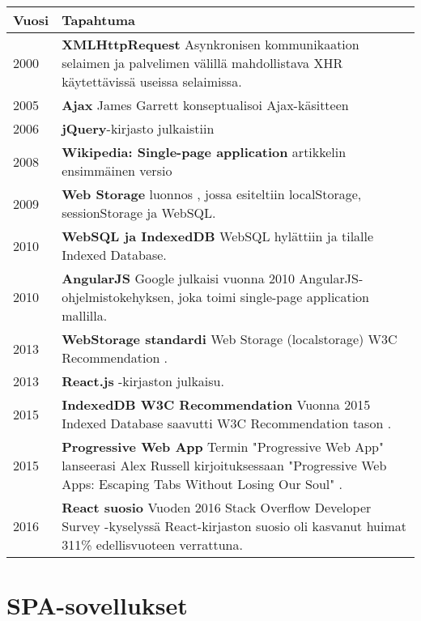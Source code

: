 \documentclass[finnish,twoside,censored,csm,sw-track-2018]{HYthesisML}
\begin{document}
\begin{center}
\begin{tabular}{ | m{2cm} | m{12cm} | } 
 \hline
 \textbf{Vuosi} & \textbf{Tapahtuma} \\ 
 \hline
 2000 & \textbf{XMLHttpRequest} Asynkronisen kommunikaation selaimen ja palvelimen välillä mahdollistava XHR käytettävissä useissa selaimissa. \citep{pwa-coined}\\ 
 \hline
 2005 & \textbf{Ajax} James Garrett konseptualisoi Ajax-käsitteen \citep{Ajax}\\ 
 \hline
 2006 & \textbf{jQuery}-kirjasto julkaistiin \citep{JSdefguide}\\
 \hline
 2008 & \textbf{Wikipedia: Single-page application} artikkelin ensimmäinen versio \citep{wikiSPA-2008} \\
 \hline
 2009 & \textbf{Web Storage} luonnos \citep{W3C-2009-webstorage}, jossa esiteltiin localStorage, sessionStorage ja WebSQL.\\
 \hline
 2010 & \textbf{WebSQL ja IndexedDB} WebSQL hylättiin \citep{W3C-2010-sqldatabase} ja tilalle \citep{W3C-2010-indexeddb} Indexed Database.\\
 \hline
  2010 & \textbf{AngularJS} Google julkaisi vuonna 2010 AngularJS-ohjelmistokehyksen, joka toimi single-page application mallilla. \citep{angularJS-release} \\
 \hline
 2013 & \textbf{WebStorage standardi} Web Storage (localstorage) W3C Recommendation \citep{W3C-2013-webstorage}. \\
 \hline
 2013 & \textbf{React.js} -kirjaston julkaisu. \\
 \hline
 2015 & \textbf{IndexedDB W3C Recommendation} Vuonna 2015 Indexed Database saavutti W3C Recommendation tason \citep{W3C-2015-indexeddb}. \\
 \hline
 2015 & \textbf{Progressive Web App} Termin "Progressive Web App" lanseerasi Alex Russell kirjoituksessaan "Progressive Web Apps: Escaping Tabs Without Losing Our Soul" \citep{pwa-coined}. \\
 \hline
 2016 & \textbf{React suosio} Vuoden 2016 Stack Overflow Developer Survey -kyselyssä \citep{SO-survey-2016} React-kirjaston suosio oli kasvanut huimat 311\% edellisvuoteen verrattuna. \\
 \hline
\end{tabular}
\label{table-aikajana}
\end{center}

\chapter{SPA-sovellukset}
\label{chapter-spa}
\end{document}
